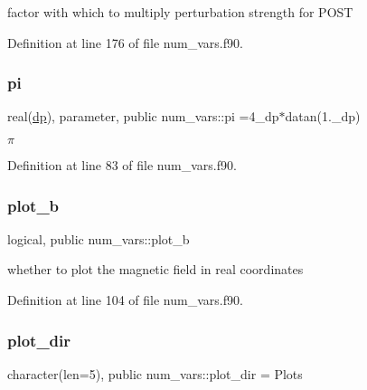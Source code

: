 factor with which to multiply perturbation strength for P\+O\+ST 



Definition at line 176 of file num\+\_\+vars.\+f90.

\mbox{\label{namespacenum__vars_a26f47310576a3414135b3d3fcc079709}} 
\subsubsection{\texorpdfstring{pi}{pi}}
{\footnotesize\ttfamily real(\hyperlink{namespacenum__vars_a03802aa2bd86439d7a9370836fabf3f2}{dp}), parameter, public num\+\_\+vars\+::pi =4\+\_\+dp$\ast$datan(1.\+\_\+dp)}



$\pi$ 



Definition at line 83 of file num\+\_\+vars.\+f90.

\mbox{\label{namespacenum__vars_a09ac710a02758a271706d96e50e5c1b1}} 
\subsubsection{\texorpdfstring{plot\+\_\+b}{plot\_b}}
{\footnotesize\ttfamily logical, public num\+\_\+vars\+::plot\+\_\+b}



whether to plot the magnetic field in real coordinates 



Definition at line 104 of file num\+\_\+vars.\+f90.

\mbox{\label{namespacenum__vars_a63868c5912af08559dcdd2db31e68696}} 
\subsubsection{\texorpdfstring{plot\+\_\+dir}{plot\_dir}}
{\footnotesize\ttfamily character(len=5), public num\+\_\+vars\+::plot\+\_\+dir = \textquotesingle{}Plots\textquotesingle{}}



